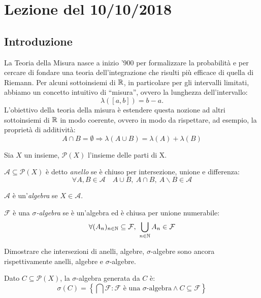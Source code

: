 \section{Lezione del 10/10/2018}
\subsection{Introduzione}
La Teoria della Misura nasce a inizio '900 per formalizzare la probabilità e per cercare di fondare una teoria dell'integrazione che risulti più efficace di quella di Riemann. Per alcuni sottoinsiemi di $\mathbb{R}$, in particolare per gli intervalli limitati, abbiamo un concetto intuitivo di ``misura'', ovvero la lunghezza dell'intervallo:
\[ \lambda\left([a,b]\right) = b-a. \]
L'obiettivo della teoria della misura è estendere questa nozione ad altri sottoinsiemi di $\mathbb{R}$ in modo coerente, ovvero in modo da rispettare, ad esempio, la proprietà di additività:
\[ A \cap B = \emptyset \Rightarrow \lambda(A\cup B) = \lambda(A) + \lambda(B) \]

Sia $X$ un insieme, $\mathscr{P}(X)$ l'insieme delle parti di X.

\begin{definition}
	$\mathcal{A} \subseteq \mathscr{P}(X)$ è detto \emph{anello} se è chiuso per intersezione, unione e differenza:
	\[ \forall A, B \in \mathcal A \quad A\cup B,\ A\cap B,\ A\backslash B \in \mathcal{A} \]
\end{definition}

\begin{definition}
	$\mathcal{A}$ è un'\emph{algebra} se $X\in \mathcal{A}$.
\end{definition}

\begin{definition}
	$\mathcal{F} $ è una \emph{$\sigma$-algebra} se è un'algebra ed è chiusa per unione numerabile:
	\[ \forall (A_n)_{n\in\N}\subseteq \mathcal{F},\ \bigcup_{n\in \N} A_n \in \mathcal{F} \]
\end{definition}

\begin{exercise}
	Dimostrare che intersezioni di anelli, algebre, $\sigma$-algebre sono ancora rispettivamente anelli, algebre e $\sigma$-algebre.
\end{exercise}

\begin{definition}
	Dato $C\subseteq \mathscr{P}(X)$, la $\sigma$-algebra generata da $C$ è:
	\[ \sigma(C)= \left\{\bigcap \mathcal{F}: \mathcal{F} \text{ è una } \sigma \text{-algebra} \wedge C\subseteq \mathcal{F} \right\} \]
\end{definition}

